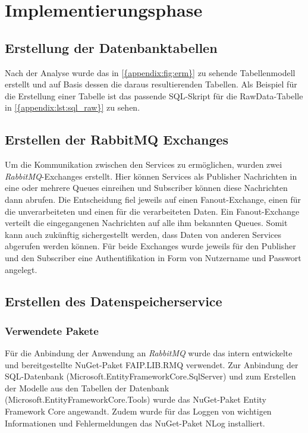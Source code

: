 \section{Implementierungsphase}


\subsection{Erstellung der Datenbanktabellen}

Nach der Analyse wurde das in \vref{{appendix:fig:erm}} zu sehende Tabellenmodell erstellt und auf Basis dessen die daraus resultierenden Tabellen. Als Beispiel für die Erstellung einer Tabelle ist das passende SQL-Skript für die RawData-Tabelle in \vref{{appendix:lst:sql_raw}} zu sehen.


\subsection{Erstellen der RabbitMQ Exchanges}

Um die Kommunikation zwischen den Services zu ermöglichen, wurden zwei \textit{\gls{RabbitMQ}}-Exchanges erstellt. Hier können Services als Publisher Nachrichten in eine oder mehrere Queues einreihen und Subscriber können diese Nachrichten dann abrufen. Die Entscheidung fiel jeweils auf  einen Fanout-Exchange, einen für die unverarbeiteten und einen für die verarbeiteten Daten. Ein Fanout-Exchange verteilt die eingegangenen Nachrichten auf alle ihm bekannten Queues. Somit kann auch zukünftig sichergestellt werden, dass Daten von anderen Services abgerufen werden können. Für beide Exchanges wurde jeweils für den Publisher und den Subscriber eine Authentifikation in Form von Nutzername und Passwort angelegt.


\subsection{Erstellen des Datenspeicherservice}


\subsubsection{Verwendete Pakete}

Für die Anbindung der Anwendung an \textit{\gls{RabbitMQ}} wurde das intern entwickelte und bereitgestellte NuGet-Paket FAIP.LIB.RMQ verwendet. Zur Anbindung der SQL-Datenbank (Microsoft.EntityFrameworkCore.SqlServer) und zum Erstellen der Modelle aus den Tabellen der Datenbank (Microsoft.EntityFrameworkCore.Tools) wurde das NuGet-Paket Entity Framework Core angewandt. Zudem wurde für das Loggen von wichtigen Informationen und Fehlermeldungen das NuGet-Paket NLog installiert.


